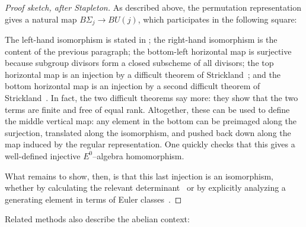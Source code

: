 \begin{proof}[Proof sketch, after Stapleton]
As described above, the permutation representation gives a natural map \(B\Sigma_j \to BU(j)\), which participates in the following square:
\begin{center}
\end{center}
The left-hand isomorphism is stated in ; the right-hand isomorphism is the content of the previous paragraph; the bottom-left horizontal map is surjective because subgroup divisors form a closed subscheme of all divisors; the top horizontal map is an injection by a difficult theorem of Strickland~\cite[Theorems 8.5--6]{StricklandEthyOfBSigma}; and the bottom horizontal map is an injection by a second difficult theorem of Strickland~\cite[Theorem 10.1]{StricklandFiniteSubgps}.  In fact, the two difficult theorems say more: they show that the two terms are finite and free of equal rank.  Altogether, these can be used to define the middle vertical map: any element in the bottom can be preimaged along the surjection, translated along the isomorphism, and pushed back down along the map induced by the regular representation.  One quickly checks that this gives a well-defined injective $E^0$--algebra homomorphism.

What remains to show, then, is that this last injection is an isomorphism, whether by calculating the relevant determinant~\cite[Section 7.9]{SchlankStapleton} or by explicitly analyzing a generating element in terms of Euler classes~\cite[Theorem 9.2]{StricklandEthyOfBSigma}.
\end{proof}

Related methods also describe the abelian context:

